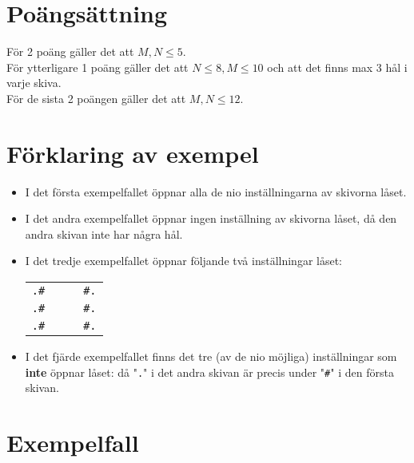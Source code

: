 \section*{Poängsättning}
För 2 poäng gäller det att $M,N \le 5$. \\
För ytterligare 1 poäng gäller det att $N \le 8, M\le 10$ och att det finns max 3 hål i varje skiva. \\
För de sista 2 poängen gäller det att $M,N \le 12$.

\section*{Förklaring av exempel}

\begin{itemize}
  \item
I det första exempelfallet öppnar alla de nio inställningarna av skivorna låset.

  \item
I det andra exempelfallet öppnar ingen inställning av skivorna låset, då den andra skivan inte har några hål.

  \item
I det tredje exempelfallet öppnar följande två inställningar låset:
\begin{center}
  \begin{tabular}{ll|ll}
    \texttt{.\#}&&& \texttt{\#.}\\
    \texttt{.\#}&&& \texttt{\#.}\\
    \texttt{.\#}&&& \texttt{\#.}
  \end{tabular}
\end{center}

  \item
    I det fjärde exempelfallet finns det tre (av de nio möjliga) inställningar som \textbf{inte} öppnar låset: då "\texttt{.}" i det andra skivan är precis under
    "\texttt{\#}" i den första skivan.

\end{itemize}

\section*{Exempelfall}

